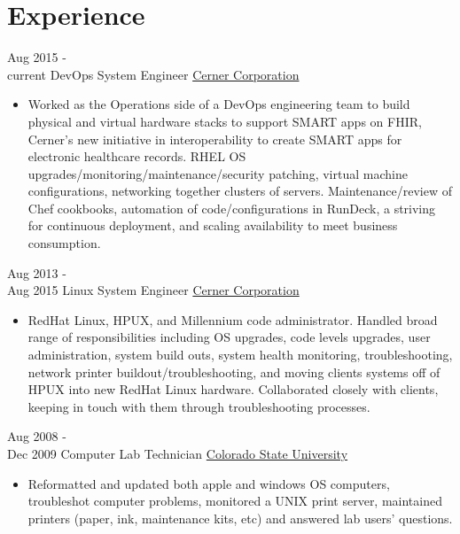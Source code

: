 \documentclass[letterpaper]{twentysecondcv} %
\begin{document}

\section{Experience}

\begin{twenty} %
	\twentyitem
    	{Aug 2015 - \\current}
        {DevOps System Engineer}
        {\href{https://www.cerner.com/}{Cerner Corporation}}
        {}
        {
        {\begin{itemize}
        \item Worked as the Operations side of a DevOps engineering team to build physical and virtual hardware stacks to support SMART apps on FHIR, Cerner’s new initiative in interoperability to create SMART apps for electronic healthcare records. RHEL OS upgrades/monitoring/maintenance/security patching, virtual machine configurations, networking together clusters of servers. Maintenance/review of Chef cookbooks, automation of code/configurations in RunDeck, a striving for continuous deployment, and scaling availability to meet business consumption.
        \end{itemize}}
        }
    \twentyitem
   		{Aug 2013 - \\ Aug 2015}
        {Linux System Engineer}
        {\href{https://www.cerner.com/}{Cerner Corporation}}
        {}
        {
        {\begin{itemize}
        \item RedHat Linux, HPUX, and Millennium code administrator.  Handled broad range of responsibilities including OS upgrades, code levels upgrades, user administration, system build outs, system health monitoring, troubleshooting, network printer buildout/troubleshooting, and moving clients systems off of HPUX into new RedHat Linux hardware.  Collaborated closely with clients, keeping in touch with them through troubleshooting processes.
        \end{itemize}}
        }
     \twentyitem
   		{Aug 2008 - \\ Dec 2009}
        {Computer Lab Technician}
        {\href{https://www.colostate.edu/}{Colorado State University}}
        {}
        {
        {\begin{itemize}
        \item Reformatted and updated both apple and windows OS computers, troubleshot computer problems, monitored a UNIX print server, maintained printers (paper, ink, maintenance kits, etc)  and answered lab users’ questions.
        \end{itemize}}
        }
\end{twenty}
\end{document}
